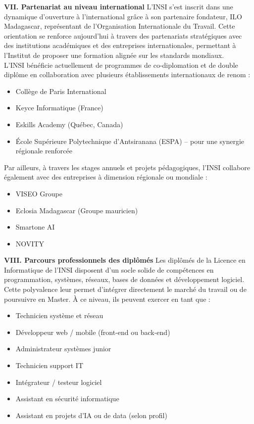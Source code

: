 \documentclass[a4paper,12pt]{book}
\begin{document}
\textbf{VII. Partenariat au niveau international} 
L’INSI s’est inscrit dans une dynamique d’ouverture à l’international grâce à son partenaire fondateur, ILO Madagascar, représentant de l’Organisation Internationale du Travail. Cette orientation se renforce aujourd’hui à travers des partenariats stratégiques avec des institutions académiques et des entreprises internationales, permettant à l’Institut de proposer une formation alignée sur les standards mondiaux.\\

L’INSI bénéficie actuellement de programmes de co-diplomation et de double diplôme en collaboration avec plusieurs établissements internationaux de renom :
\begin{itemize}
    \item Collège de Paris International
    \item Keyce Informatique (France)
    \item Eskills Academy (Québec, Canada)
    \item École Supérieure Polytechnique d’Antsiranana (ESPA) – pour une synergie régionale renforcée
\end{itemize}

Par ailleurs, à travers les stages annuels et projets pédagogiques, l’INSI collabore également avec des entreprises à dimension régionale ou mondiale :
\begin{itemize}
    \item VISEO Groupe
    \item Eclosia Madagascar (Groupe mauricien)
    \item Smartone AI
    \item NOVITY
\end{itemize}

\textbf{VIII. Parcours professionnels des diplômés} 
Les diplômés de la Licence en Informatique de l’INSI disposent d’un socle solide de compétences en programmation, systèmes, réseaux, bases de données et développement logiciel. Cette polyvalence leur permet d’intégrer directement le marché du travail ou de poursuivre en Master. À ce niveau, ils peuvent exercer en tant que :
\begin{itemize}
    \item Technicien système et réseau
    \item Développeur web / mobile (front-end ou back-end)
    \item Administrateur systèmes junior
    \item Technicien support IT
    \item Intégrateur / testeur logiciel
    \item Assistant en sécurité informatique
    \item Assistant en projets d’IA ou de data (selon profil)
\end{itemize}
\end{document}
